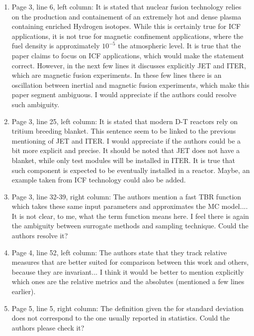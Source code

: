 \documentclass[12pt]{article}
\begin{document}
\begin{enumerate}
{\bf }

\item Page 3, line 6, left column:
It is stated that nuclear fusion technology relies on the production and containement of an extremely hot and dense plasma containing enriched Hydrogen isotopes. While this is certainly true for ICF applications, it is not true for magnetic confinement applications, where the fuel density is approximately $10^{-5}$ the atmospheric level. It is true that the paper claims to focus on ICF applications, which would make the statement correct. However, in the next few lines it discusses explicitly JET and ITER, which are magnetic fusion experiments. In these few lines there is an oscillation between inertial and magnetic fusion experiments, which make this paper segment ambiguous. I would appreciate if the authors could resolve such ambiguity.

{\bf }

\item Page 3, line 25, left column:
It is stated that modern D-T reactors rely on tritium breeding blanket. This sentence seem to be linked to the previous mentioning of JET and ITER. I would appreciate if the authors could be a bit more explicit and precise. It should be noted that JET does not have a blanket, while only test modules will be installed in ITER. It is true that such component is expected to be eventually installed in a reactor. Maybe, an example taken from ICF technology could also be added.

{\bf }

\item Page 3, line 32-39, right column:
The authors mention a fast TBR function which takes these same input parameters and approximates the MC model.... It is not clear, to me, what the term function means here. I feel there is again the ambiguity between surrogate methods and sampling technique. Could the authors resolve it?

{\bf }

\item Page 4, line 52, left column:
The authors state that they track relative measures that are better suited for comparison between this work and others, because they are invariant... I think it would be better to mention explicitly which ones are the relative metrics and the absolutes (mentioned a few lines earlier).

{\bf }

\item Page 5, line 5, right column:
The definition given the for standard deviation does not correspond to the one usually reported in statistics. Could the authors please check it?


\end{enumerate}
\end{document}
